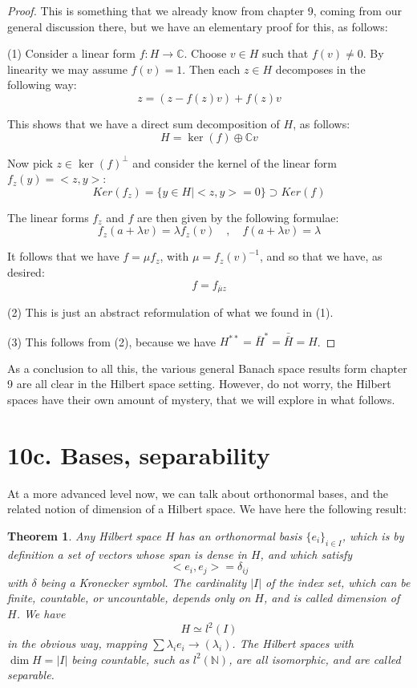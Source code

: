 \documentclass[12pt]{amsbook}
\newtheorem{theorem}{Theorem}[chapter]
\begin{document}
\begin{proof}
This is something that we already know from chapter 9, coming from our general discussion there, but we have an elementary proof for this, as follows:

\medskip

(1) Consider a linear form $f:H\to\mathbb C$. Choose $v\in H$ such that $f(v)\neq 0$. By linearity we may assume $f(v)=1$. Then each $z\in H$ decomposes in the following way:
$$z=(z-f(z)v)+f(z)v$$

This shows that we have a direct sum decomposition of $H$, as follows:
$$H=\ker(f)\oplus \mathbb C v$$

Now pick $z\in\ker(f)^\perp$ and consider the kernel of the linear form $f_z(y)=<z,y>$:
$$Ker(f_z)=\{y\in H| <z,y>=0\} \supset Ker (f)$$

The linear forms $f_z$ and $f$ are then given by the following formulae:
$$f_z(a+\lambda v)=\lambda f_z(v)\quad,\quad f(a+\lambda v)=\lambda$$

It follows that we have $f=\mu f_z$, with $\mu=f_z(v)^{-1}$, and so that we have, as desired:
$$f=f_{\overline{\mu} z}$$

(2) This is just an abstract reformulation of what we found in (1).

\medskip

(3) This follows from (2), because we have $H^{**}=\bar{H}^*=\bar{\bar{H}}=H$.
\end{proof}

As a conclusion to all this, the various general Banach space results form chapter 9 are all clear in the Hilbert space setting. However, do not worry, the Hilbert spaces have their own amount of mystery, that we will explore in what follows.

\section*{10c. Bases, separability}

At a more advanced level now, we can talk about orthonormal bases, and the related notion of dimension of a Hilbert space. We have here the following result:


\begin{theorem}
Any Hilbert space $H$ has an orthonormal basis $\{e_i\}_{i\in I}$, which is by definition a set of vectors whose span is dense in $H$, and which satisfy
$$<e_i,e_j>=\delta_{ij}$$
with $\delta$ being a Kronecker symbol. The cardinality $|I|$ of the index set, which can be finite, countable, or uncountable, depends only on $H$, and is called dimension of $H$. We have
$$H\simeq l^2(I)$$
in the obvious way, mapping $\sum\lambda_ie_i\to(\lambda_i)$. The Hilbert spaces with $\dim H=|I|$ being countable, such as $l^2(\mathbb N)$, are all isomorphic, and are called separable.
\end{theorem}
\end{document}
